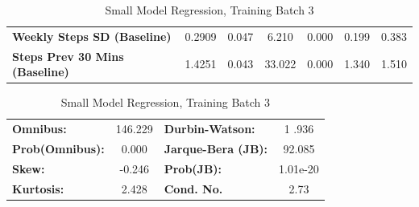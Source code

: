 \begin{table}
\begin{tabular}{lcccccc}
\textbf{Weekly Steps SD (Baseline)}    &       0.2909  &        0.047     &     6.210  &         0.000        &        0.199    &        0.383     \\
\textbf{Steps Prev 30 Mins (Baseline)} &       1.4251  &        0.043     &    33.022  &         0.000        &        1.340    &        1.510     \\
\bottomrule
\end{tabular}
\begin{tabular}{lclc}
\textbf{Omnibus:}       & 146.229 & \textbf{  Durbin-Watson:     } &    1	.936  \\
\textbf{Prob(Omnibus):} &   0.000 & \textbf{  Jarque-Bera (JB):  } &   92.085  \\
\textbf{Skew:}          &  -0.246 & \textbf{  Prob(JB):          } & 1.01e-20  \\
\textbf{Kurtosis:}      &   2.428 & \textbf{  Cond. No.          } &     2.73  \\
\bottomrule
\end{tabular}
\caption{Small Model Regression, Training Batch 3}
\end{table}

\medskip
